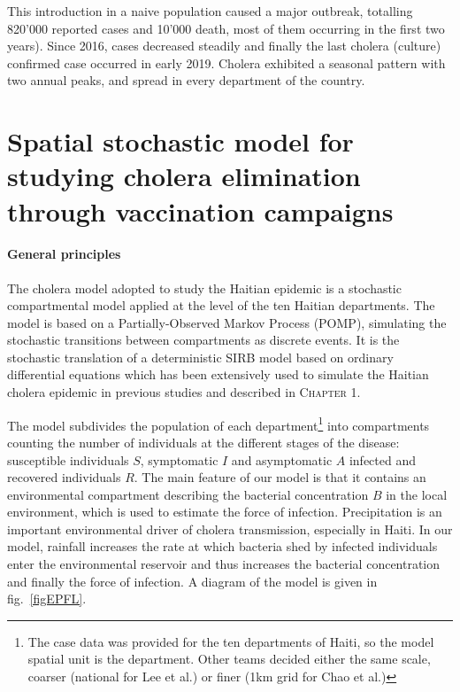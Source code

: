This introduction in a naive population caused a major outbreak, totalling 820'000 reported cases and 10'000 death, most of them occurring in the first two years\cite{Barzilay:CholeraSurveillanceHaiti:2013}).  Since 2016, cases decreased steadily and finally the last cholera (culture) confirmed case occurred in early 2019\cite{RepubliquedHaiti:ProfilStatistiqueCholera}. Cholera exhibited a seasonal pattern with two annual peaks, and spread in every department of the country.


\section{Spatial stochastic model for studying cholera elimination through vaccination campaigns}

\paragraph{General principles} The cholera model adopted to study the Haitian epidemic is a stochastic compartmental model applied at the level of the ten Haitian departments. 
The model is based on a Partially-Observed Markov Process (POMP), simulating the stochastic transitions between compartments as discrete events\cite{King:InapparentInfectionsCholera:2008}. 
It is the stochastic translation of a deterministic SIRB model based on ordinary differential equations which has been extensively used to simulate the Haitian cholera epidemic in previous studies\cite[-4\baselineskip]{Rinaldo:Reassessment20102011:2012,Bertuzzo:ProbabilityExtinctionHaiti:2016,Pasetto:RealtimeForecastingCholera:2018,Camacho:PredictionCholeraDynamics:2016} and described in \textsc{Chapter 1}.

The model subdivides the population of each department\footnote{The case data was provided for the ten departments of Haiti, so the model spatial unit is the department. Other teams decided either the same scale, coarser (national for Lee et al.) or finer (1km grid for Chao et al.)} into compartments counting the number of individuals at the different stages of the disease: susceptible individuals $S$, symptomatic $I$ and asymptomatic $A$ infected and recovered individuals $R$. The main feature of our model is that it contains an environmental compartment describing the bacterial concentration $B$ in the local environment, which is used to estimate the force of infection\cite{Rinaldo:Reassessment20102011:2012, Bertuzzo:PredictionSpatialEvolution:2011}. Precipitation is an important environmental driver of cholera transmission\cite{Camacho:CholeraEpidemicYemen:2018}, especially in Haiti. In our model, rainfall increases the rate at which bacteria shed by infected individuals enter the environmental reservoir and thus increases the bacterial concentration and finally the force of infection\cite{Lemaitre:RainfallDriverEpidemic:2019}. A diagram of the model is given in fig.~\ref{figEPFL}.
